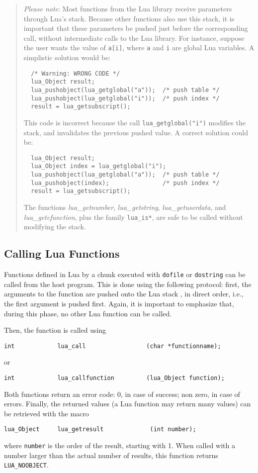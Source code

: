 \begin{quotation}
\noindent
{\em Please note\/}:
Most functions from the Lua library receive parameters through Lua's stack.
Because other functions also use this stack,
it is important that these
parameters be pushed just before the corresponding call,
without intermediate calls to the Lua library.
For instance, suppose the user wants the value of \verb'a[i]',
where \verb'a' and \verb'i' are global Lua variables.
A simplistic solution would be:
\begin{verbatim}
  /* Warning: WRONG CODE */
  lua_Object result;
  lua_pushobject(lua_getglobal("a"));  /* push table */
  lua_pushobject(lua_getglobal("i"));  /* push index */
  result = lua_getsubscript();
\end{verbatim}
This code is incorrect because
the call \verb'lua_getglobal("i")' modifies the stack,
and invalidates the previous pushed value.
A correct solution could be:
\begin{verbatim}
  lua_Object result;
  lua_Object index = lua_getglobal("i");
  lua_pushobject(lua_getglobal("a"));  /* push table */
  lua_pushobject(index);               /* push index */
  result = lua_getsubscript();
\end{verbatim}
The functions {\em lua\_getnumber}, {\em lua\_getstring},
{\em lua\_getuserdata}, and {\em lua\_getcfunction},
plus the family \verb|lua_is*|,
are safe to be called without modifying the stack.
\end{quotation}

\subsection{Calling Lua Functions}
Functions defined in Lua by a chunk executed with
\verb'dofile' or \verb'dostring' can be called from the host program.
This is done using the following protocol:
first, the arguments to the function are pushed onto the Lua stack
, in direct order, i.e., the first argument is pushed first.
Again, it is important to emphasize that, during this phase,
no other Lua function can be called.

Then, the function is called using
\begin{verbatim}
int            lua_call                 (char *functionname);
\end{verbatim}
or
\begin{verbatim}
int            lua_callfunction         (lua_Object function);
\end{verbatim}
Both functions return an error code:
0, in case of success; non zero, in case of errors.
Finally, the returned values (a Lua function may return many values)
can be retrieved with the macro
\begin{verbatim}
lua_Object     lua_getresult             (int number);
\end{verbatim}
where \verb'number' is the order of the result, starting with 1.
When called with a number larger than the actual number of results,
this function returns \verb'LUA_NOOBJECT'.

